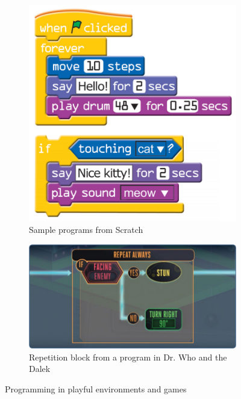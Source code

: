 \documentclass{sigchi}
\begin{document}
		\begin{figure}
			\centering
			\begin{subfigure}[!h]{0.5\columnwidth}
				\includegraphics[width=\textwidth]{scratch}
				\caption{Sample programs from Scratch}
				\label{fig:scratch}
			\end{subfigure}%

			\begin{subfigure}[!h]{0.7\columnwidth}
				\includegraphics[width=\textwidth]{dr-who}
				\caption{Repetition block from a program in Dr. Who and the Dalek}
				\label{fig:dr-who}
			\end{subfigure}
			\caption{Programming in playful environments and games}
			\label{fig:samples}
		\end{figure}
\end{document}
